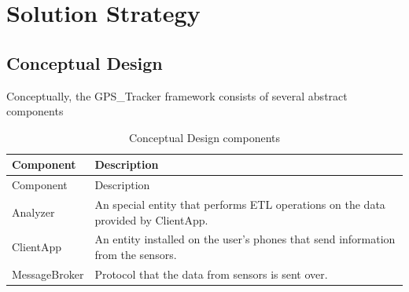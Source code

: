 \section{Solution Strategy}\label{solution-strategy}

\subsection{Conceptual Design}\label{conceptual-design}

Conceptually, the GPS\_Tracker framework consists of several abstract
components

\begin{longtable}[]{@{}ll@{}}
\caption{Conceptual Design components}\tabularnewline
\toprule
\begin{minipage}[b]{0.47\columnwidth}\raggedright
Component\strut
\end{minipage} & \begin{minipage}[b]{0.47\columnwidth}\raggedright
Description\strut
\end{minipage}\tabularnewline
\midrule
\endfirsthead
\toprule
\begin{minipage}[b]{0.47\columnwidth}\raggedright
Component\strut
\end{minipage} & \begin{minipage}[b]{0.47\columnwidth}\raggedright
Description\strut
\end{minipage}\tabularnewline
\midrule
\endhead
\begin{minipage}[t]{0.47\columnwidth}\raggedright
Analyzer\strut
\end{minipage} & \begin{minipage}[t]{0.47\columnwidth}\raggedright
An special entity that performs ETL operations on the data provided by
ClientApp.\strut
\end{minipage}\tabularnewline
\begin{minipage}[t]{0.47\columnwidth}\raggedright
ClientApp\strut
\end{minipage} & \begin{minipage}[t]{0.47\columnwidth}\raggedright
An entity installed on the user's phones that send information from the
sensors.\strut
\end{minipage}\tabularnewline
\begin{minipage}[t]{0.47\columnwidth}\raggedright
MessageBroker\strut
\end{minipage} & \begin{minipage}[t]{0.47\columnwidth}\raggedright
Protocol that the data from sensors is sent over.\strut

\end{minipage}
\end{longtable}
